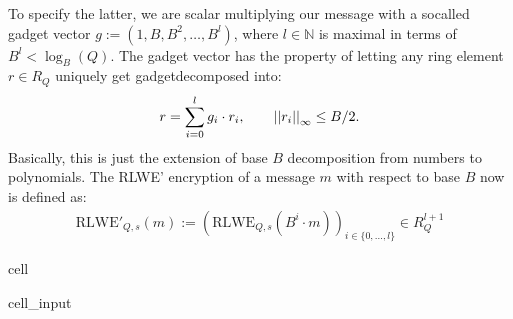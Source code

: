 \documentclass[letterpaper,10pt,english]{jupyterBook}
\begin{document}
\sphinxAtStartPar
To specify the latter, we are scalar multiplying our message with a so\sphinxhyphen{}called gadget vector \(g := (1,B,B^2,\dots,B^l)\), where \(l \in \mathbb N\) is maximal in terms of \(B^l < \log_B(Q)\).
The gadget vector has the property of letting any ring element \(r\in R_Q\) uniquely get gadget\sphinxhyphen{}decomposed into:
\begin{equation*}
\begin{split}r = \sum_{i=0}^l g_i \cdot r_i, \qquad \left\lvert\left\lvert r_i \right\rvert\right\rvert_\infty \le B/2.\end{split}
\end{equation*}
\sphinxAtStartPar
Basically, this is just the extension of base \(B\) decomposition from numbers to polynomials.
The RLWE’ encryption of a message \(m\) with respect to base \(B\) now is defined as:
\begin{equation*}
\begin{split}\mathrm{RLWE'}_{Q,s}(m) := (\mathrm{RLWE}_{Q,s}(B^i \cdot m))_{i \in \{0, \dots, l\}} \in R_Q^{l+1}\end{split}
\end{equation*}
\begin{sphinxuseclass}{cell}\begin{sphinxVerbatimInput}

\begin{sphinxuseclass}{cell_input}
\begin{sphinxVerbatim}[commandchars=\\\{\}]
     
            
      \PYG{p}{[}        \PYG{p}{]}
     \PYG{p}{[}\PYG{p}{[}\PYG{p}{]}       \PYG{p}{]}
\end{sphinxVerbatim}

\end{sphinxuseclass}\end{sphinxVerbatimInput}

\end{sphinxuseclass}
\end{document}
